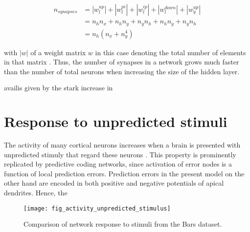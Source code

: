 \begin{align}
    n_{synapses} & = |w_{l}^{up}| + |w_{l}^{pi}| + |w_{l}^{ip}| + |w_{l}^{down}| + |w_{y}^{up}| \\
                 & = n_h n_x + n_h n_y + n_y n_h  + n_h n_y + n_y  n_h                          \\
                 & = n_h (n_x + n_y^4)
\end{align}

with $|w|$ of a weight matrix $w$ in this case denoting the total number of elements in that matrix . Thus, the number of synapses in a network grows much faster than the number of total
    neurons when increasing the size of the hidden layer.

availis given by the stark increase in

\section{Response to unpredicted stimuli}

The activity of many cortical neurons increases when a brain is presented with unpredicted stimuly that regard these
neurons . This property is prominently replicated by
predictive coding networks, since activation of error nodes is a function of local prediction errors. Prediction errors
in the present model on the other hand are encoded in both positive and negative potentials of apical dendrites. Hence, 
the 

\begin{figure}[t]
    \centering
    \texttt{[image: fig\_activity\_unpredicted\_stimulus]}
    \caption{Comparison of network response to stimuli from the Bars dataset.}
    \label{fig-stimulus-response}
\end{figure}




